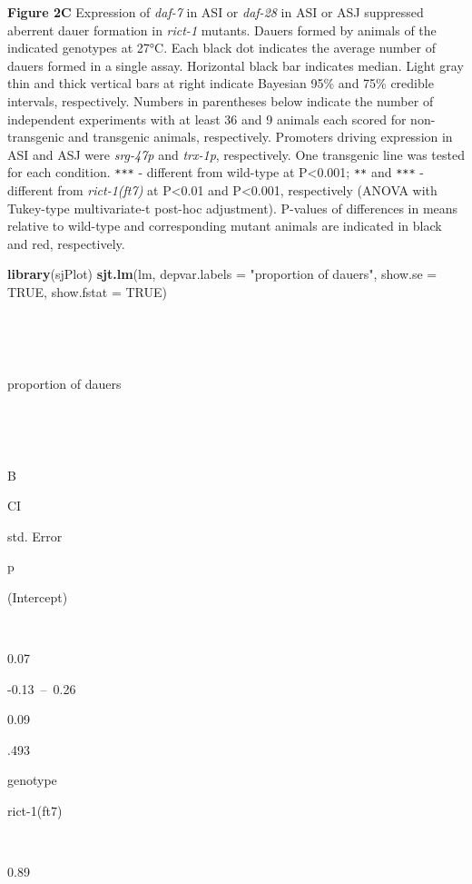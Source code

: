 \documentclass[]{article}
\newenvironment{Shaded}{\begin{snugshade}}{\end{snugshade}}
\newcommand{\KeywordTok}[1]{\textcolor[rgb]{0.13,0.29,0.53}{\textbf{#1}}}
\newcommand{\DataTypeTok}[1]{\textcolor[rgb]{0.13,0.29,0.53}{#1}}
\newcommand{\StringTok}[1]{\textcolor[rgb]{0.31,0.60,0.02}{#1}}
\newcommand{\OtherTok}[1]{\textcolor[rgb]{0.56,0.35,0.01}{#1}}
\newcommand{\NormalTok}[1]{#1}
\begin{document}
 \textbf{Figure 2C} Expression of \emph{daf-7} in ASI or \emph{daf-28}
in ASI or ASJ suppressed aberrent dauer formation in \emph{rict-1}
mutants. Dauers formed by animals of the indicated genotypes at 27°C.
Each black dot indicates the average number of dauers formed in a single
assay. Horizontal black bar indicates median. Light gray thin and thick
vertical bars at right indicate Bayesian 95\% and 75\% credible
intervals, respectively. Numbers in parentheses below indicate the
number of independent experiments with at least 36 and 9 animals each
scored for non-transgenic and transgenic animals, respectively.
Promoters driving expression in ASI and ASJ were \emph{srg-47p} and
\emph{trx-1p}, respectively. One transgenic line was tested for each
condition. {\texttt{***}} - different from wild-type at
P\textless{}0.001; {\texttt{**}} and {\texttt{***}} - different from
\emph{rict-1(ft7)} at P\textless{}0.01 and P\textless{}0.001,
respectively (ANOVA with Tukey-type multivariate-t post-hoc adjustment).
P-values of differences in means relative to wild-type and corresponding
mutant animals are indicated in black and red, respectively.

\begin{Shaded}
\begin{Highlighting}[]
\KeywordTok{library}\NormalTok{(sjPlot)}
\KeywordTok{sjt.lm}\NormalTok{(lm, }\DataTypeTok{depvar.labels =} \StringTok{"proportion of dauers"}\NormalTok{, }\DataTypeTok{show.se =} \OtherTok{TRUE}\NormalTok{, }\DataTypeTok{show.fstat =} \OtherTok{TRUE}\NormalTok{)}
\end{Highlighting}
\end{Shaded}

~

~

proportion of dauers

~

~

B

CI

std. Error

p

(Intercept)

~

0.07

-0.13~--~0.26

0.09

.493

genotype

rict-1(ft7)

~

0.89
\end{document}
